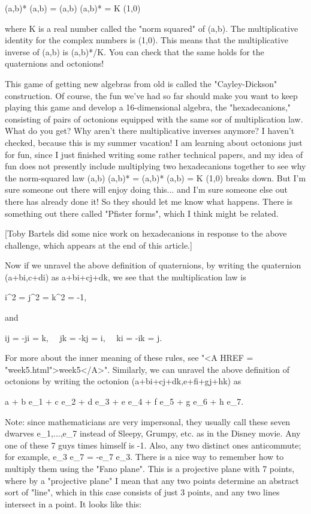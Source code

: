 (a,b)* (a,b) = (a,b) (a,b)* = K (1,0)

where K is a real number called the "norm squared" of (a,b).
The multiplicative identity for the complex numbers is (1,0).
This means that the multiplicative inverse of (a,b) is (a,b)*/K.  
You can check that the same holds for the quaternions and 
octonions!  

This game of getting new algebras from old is called the
"Cayley-Dickson" construction.  Of course, the fun we've had so 
far should make you want to keep playing this game and develop 
a 16-dimensional algebra, the "hexadecanions,"
consisting of pairs of octonions equipped with the same sor
of multiplication law.  What do you get?  Why aren't there
multiplicative inverses anymore?  I haven't checked, because
this is my summer vacation!  I am learning about octonions 
just for fun, since I just finished writing some rather technical papers, 
and my idea of fun does not presently include multiplying two 
hexadecanions together to see why the norm-squared law (a,b) (a,b)* =
(a,b)* (a,b) = K (1,0) breaks down.  But I'm sure someone out there 
will enjoy doing this... and I'm sure someone else out there has already 
done it!  So they should let me know what happens.  There is something
out there called "Pfister forms", which I think might be related.

[Toby Bartels did some nice work on hexadecanions in response to
the above challenge, which appears at the end of this article.]

Now if we unravel the above definition of quaternions, by writing
the quaternion (a+bi,c+di) as a+bi+cj+dk, we see that the multiplication
law is 

i^{2} = j^{2} = k^{2} = -1, 

and 

ij = -ji = k, \  \  jk = -kj = i, \  \  ki = -ik = j.

For more about the inner meaning of these rules, see "<A HREF = "week5.html">week5</A>".
Similarly, we can unravel the above definition of octonions by 
writing the octonion (a+bi+cj+dk,e+fi+gj+hk) as

a + b e_{1} + c e_{2} + d e_{3} + e e_{4} + f e_{5} + g e_{6} + h e_{7}.

Note: since mathematicians are very impersonal, they usually call
these seven dwarves e_{1},...,e_{7} instead of Sleepy,
Grumpy, etc. as in the Disney movie.  Any one of these 7 guys times
himself is -1.  Also, any two distinct ones anticommute; for example,
e_{3} e_{7} = -e_{7} e_{3}.  There is
a nice way to remember how to multiply them using the "Fano plane".
This is a projective plane with 7 points, where by a "projective
plane" I mean that any two points determine an abstract sort of
"line", which in this case consists of just 3 points, and any two
lines intersect in a point.  It looks like this:

